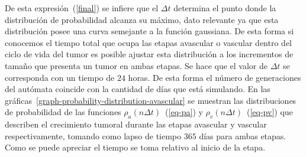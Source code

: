De esta expresi\'on~(\ref{final}) se infiere que el $\Delta t$ determina el punto donde la distribuci\'on de probabilidad alcanza su m\'aximo, dato relevante ya que esta distribuci\'on posee una curva semejante a la funci\'on gaussiana. De esta forma si conocemos el tiempo total que ocupa las etapas avascular o vascular dentro del ciclo de vida del tumor es posible ajustar esta distribuci\'on a los incrementos de tama\~no que presenta un tumor en ambas etapas. Se hace que el valor de $\Delta t$ se corresponda con un tiempo de $24$ horas. De esta forma el n\'umero de generaciones del aut\'omata coincide con la cantidad de d\'ias que est\'a simulando. En las gr\'aficas~\ref{graph-probability-distribution-avascular} se muestran las distribuciones de probabilidad de las funciones $\rho_a(n\Delta t)$~(\ref{eq-pa}) y $\rho_v(n\Delta t)$~(\ref{eq-pv}) que describen el crecimiento tumoral durante las etapas avascular y vascular respectivamente, tomando como lapso de tiempo $365$ d\'ias para ambas etapas. Como se puede apreciar el tiempo se toma relativo al inicio de la etapa.
